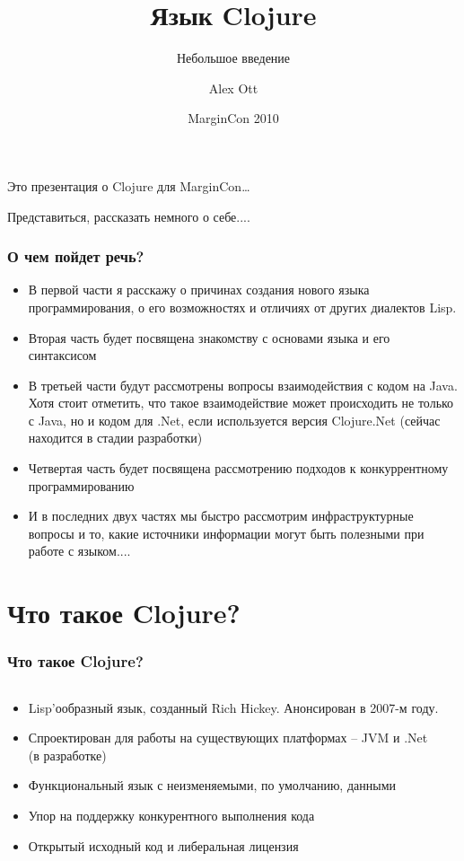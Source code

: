 \documentclass[ignorenonframetext]{beamer}
\title{Язык Clojure}
\subtitle{Небольшое введение}
\author{Alex Ott}
\institute[\lstinline!alexott@gmail.com!]{\url{http://alexott.net}}
\date{MarginCon 2010}
\begin{document}

Это презентация о Clojure для MarginCon\ldots{}

\frame{\titlepage
}

Представиться, рассказать немного о себе....

\begin{frame}[t]
\frametitle{О чем пойдет речь?}
\tableofcontents
\end{frame}

\begin{itemize}
\item В первой части я расскажу о причинах создания нового языка программирования, о его
  возможностях и отличиях от других диалектов Lisp.
\item Вторая часть будет посвящена знакомству с основами языка и его синтаксисом
\item В третьей части будут рассмотрены вопросы взаимодействия с кодом на Java.  Хотя
  стоит отметить, что такое взаимодействие может происходить не только с Java, но и кодом
  для .Net, если используется версия Clojure.Net (сейчас находится в стадии разработки)
\item Четвертая часть будет посвящена рассмотрению подходов к конкуррентному программированию
\item И в последних двух частях мы быстро рассмотрим инфраструктурные вопросы и то, какие
  источники информации могут быть полезными при работе с языком....
\end{itemize}


\section{Что такое Clojure?}

\begin{frame}[t]
  \frametitle{Что такое Clojure?}
  \begin{columns}
    \begin{column}{0.7\textwidth}
  \begin{itemize}
  \item Lisp'ообразный язык, созданный Rich Hickey.  Анонсирован в 2007-м году.
  \item Спроектирован для работы на существующих платформах -- JVM и .Net (в разработке)
  \item Функциональный язык с неизменяемыми, по умолчанию, данными
  \item Упор на поддержку конкурентного выполнения кода
  \item Открытый исходный код и либеральная лицензия
  \end{itemize}
    \end{column}
    \begin{column}{0.3\textwidth}
      \begin{center}
      \end{center}
    \end{column}
  \end{columns}
\end{frame}
\end{document}
